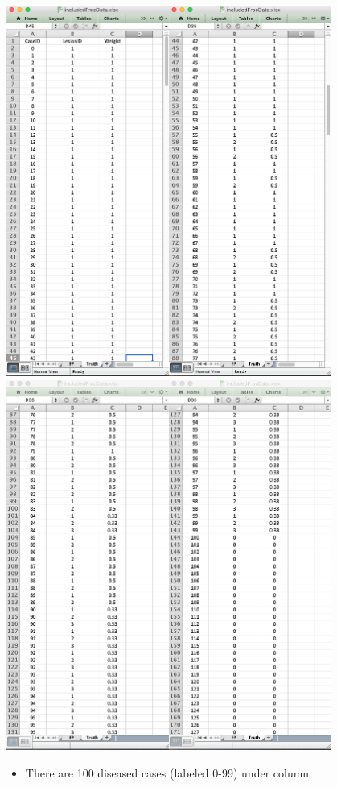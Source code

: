 \documentclass[]{book}
\begin{document}
\includegraphics[width=0.4\textwidth,height=\textheight]{images/FROC-Truth-1.png}\includegraphics[width=0.4\textwidth,height=\textheight]{images/FROC-Truth-2.png}\includegraphics[width=0.4\textwidth,height=\textheight]{images/FROC-Truth-3.png}\includegraphics[width=0.4\textwidth,height=\textheight]{images/FROC-Truth-4.png}

\begin{itemize}
\item
  There are 100 diseased cases (labeled 0-99) under column
\end{itemize}
\end{document}
